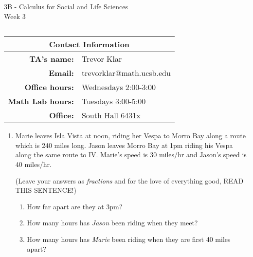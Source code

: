 \documentclass[12pt,letterpaper]{article}
\begin{document}
\thispagestyle{fancy}
\begin{center}
3B - Calculus for Social and Life Sciences\\
Week 3 %
\end{center}

\hrule

\begin{center}
\begin{tabular}{|rl|}
\hline
\multicolumn{2}{|c|}{Contact Information} \\
\hline
\bf{TA's name:} & Trevor Klar \\
\bf{Email:} & trevorklar@math.ucsb.edu \\
\bf{Office hours:} & Wednesdays 2:00-3:00 \\
\bf{Math Lab hours:} & Tuesdays 3:00-5:00 \\
\bf{Office:} & South Hall 6431x \\
\hline
\end{tabular}
\end{center}


\bigskip

\begin{enumerate}

\item 
Marie leaves Isla Vista at noon, riding her Vespa to Morro Bay along a route which is 240 miles long. Jason leaves Morro Bay at 1pm riding his Vespa along the same route to IV. Marie's speed is 30 miles/hr and Jason's speed is 40 miles/hr. 

(Leave your answers as \emph{fractions} and for the love of everything good, READ THIS SENTENCE!)

	\begin{enumerate}[label=(\alph*)]
	\item How far apart are they at 3pm?
	\vfill
	
	\item How many hours has \emph{Jason} been riding when they meet?
	\vfill
	
	\item How many hours has \emph{Marie} been riding when they are first 40 miles apart?
	\vfill
	\end{enumerate}





\end{enumerate}
\end{document}
